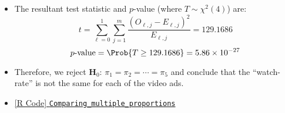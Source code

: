 \begin{itemize}
\begin{center}
\begin{NiceTabular}{cc|ccccc|c}
                  \end{NiceTabular}
            \end{center}
      \item The resultant test statistic and $ p $-value (where $ T \sim \chi^2(4) $) are:
            \[ t=\sum_{\ell=0}^{1} \sum_{j=1}^{m} \frac{(O_{\ell,j}-E_{\ell,j})^2}{E_{\ell,j}} =129.1686 \]
            \[ p\text{-value}=\Prob{T\ge 129.1686}=5.86\times 10^{-27} \]
      \item Therefore, we reject $ \mathbf{H}_0 $: $ \pi_1=\pi_2=\cdots=\pi_5 $ and conclude that
            the ``watch-rate'' is not the same for each of the video ads.
      \item \href{https://github.com/Hextical/university-notes/blob/master/year-3/semester-3/STAT 430/code/W3/Comparing_multiple_proportions.R}{[R Code] \texttt{Comparing\_multiple\_proportions}}
\end{itemize}
